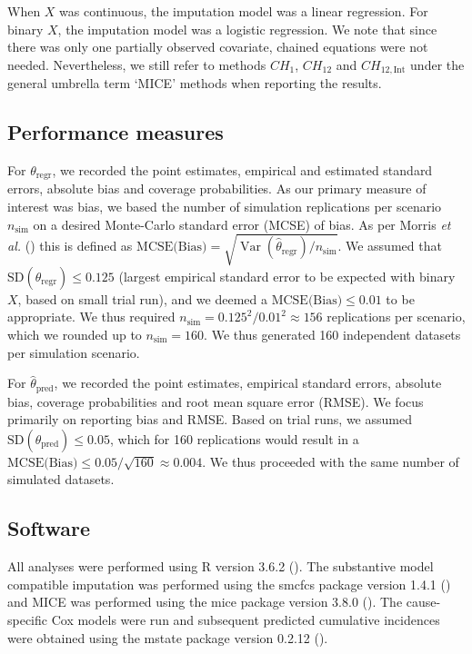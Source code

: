 \documentclass[
  letterpaper,
  paper=240mm:170mm,
  twoside=true,
  open=right,
  fontsize=10pt,
  pagesize=false,
  BCOR=15mm,
  DIV=14,
  headinclude=true,
  footinclude=false,
  headsepline=on]{scrbook}
\DeclareMathOperator{\Var}{Var}
\begin{document}
When \(X\) was continuous, the imputation model was a linear regression.
For binary \(X\), the imputation model was a logistic regression. We
note that since there was only one partially observed covariate, chained
equations were not needed. Nevertheless, we still refer to methods
\(CH_{1}\), \(CH_{12}\) and \(CH_{12,\text{Int}}\) under the general
umbrella term `MICE' methods when reporting the results.

\subsection{Performance measures}\label{performance-measures}

For \(\theta_{\text{regr}}\), we recorded the point estimates, empirical
and estimated standard errors, absolute bias and coverage probabilities.
As our primary measure of interest was bias, we based the number of
simulation replications per scenario \(n_{\text{sim}}\) on a desired
Monte-Carlo standard error (MCSE) of bias. As per Morris \emph{et al.}
() this is defined
as
\(\text{MCSE(Bias)} = \sqrt{\Var(\hat{\theta}_{\text{regr}})/n_{\text{sim}}}\).
We assumed that \(\text{SD}(\hat{\theta}_{\text{regr}})\leq 0.125\)
(largest empirical standard error to be expected with binary \(X\),
based on small trial run), and we deemed a
\(\text{MCSE(Bias)} \leq 0.01\) to be appropriate. We thus required
\(n_{\text{sim}} = 0.125^2 / 0.01^2 \approx 156\) replications per
scenario, which we rounded up to \(n_{\text{sim}} = 160\). We thus
generated 160 independent datasets per simulation scenario.

For \(\hat{\theta}_{\text{pred}}\), we recorded the point estimates,
empirical standard errors, absolute bias, coverage probabilities and
root mean square error (RMSE). We focus primarily on reporting bias and
RMSE. Based on trial runs, we assumed
\(\text{SD}(\hat{\theta}_{\text{pred}})\leq 0.05\), which for 160
replications would result in a
\(\text{MCSE(Bias)} \leq 0.05 / \sqrt{160} \approx 0.004\). We thus
proceeded with the same number of simulated datasets.

\subsection{Software}\label{software}

All analyses were performed using R version 3.6.2
(). The substantive model compatible imputation was performed using
the smcfcs package version 1.4.1
() and MICE was performed using the mice package version 3.8.0
(). The cause-specific Cox models were run and
subsequent predicted cumulative incidences were obtained using the
mstate package version 0.2.12
().
\end{document}
